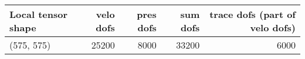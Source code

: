 \begin{tabular}{lrrrr}
\toprule
Local tensor shape &  velo dofs &  pres dofs &  sum dofs &  trace dofs (part of velo dofs) \\
\midrule
        (575, 575) &      25200 &       8000 &     33200 &                            6000 \\
\bottomrule
\end{tabular}
